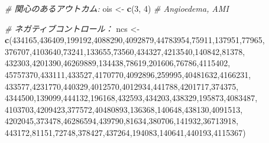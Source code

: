 \documentclass[
  11pt]{book}
\newenvironment{Shaded}{\begin{snugshade}}{\end{snugshade}}
\newcommand{\CommentTok}[1]{\textcolor[rgb]{0.56,0.35,0.01}{\textit{#1}}}
\newcommand{\DecValTok}[1]{\textcolor[rgb]{0.00,0.00,0.81}{#1}}
\newcommand{\FunctionTok}[1]{\textcolor[rgb]{0.13,0.29,0.53}{\textbf{#1}}}
\newcommand{\NormalTok}[1]{#1}
\newcommand{\OtherTok}[1]{\textcolor[rgb]{0.56,0.35,0.01}{#1}}
\theoremstyle{definition}
\theoremstyle{definition}
\theoremstyle{definition}
\theoremstyle{definition}
\theoremstyle{remark}
\begin{document}
\begin{Shaded}
\begin{Highlighting}[]
\CommentTok{\# 関心のあるアウトカム:}
\NormalTok{ois }\OtherTok{\textless{}{-}} \FunctionTok{c}\NormalTok{(}\DecValTok{3}\NormalTok{, }\DecValTok{4}\NormalTok{) }\CommentTok{\# Angioedema, AMI}

\CommentTok{\# ネガティブコントロール：}
\NormalTok{ncs }\OtherTok{\textless{}{-}} \FunctionTok{c}\NormalTok{(}\DecValTok{434165}\NormalTok{,}\DecValTok{436409}\NormalTok{,}\DecValTok{199192}\NormalTok{,}\DecValTok{4088290}\NormalTok{,}\DecValTok{4092879}\NormalTok{,}\DecValTok{44783954}\NormalTok{,}\DecValTok{75911}\NormalTok{,}\DecValTok{137951}\NormalTok{,}\DecValTok{77965}\NormalTok{,}
         \DecValTok{376707}\NormalTok{,}\DecValTok{4103640}\NormalTok{,}\DecValTok{73241}\NormalTok{,}\DecValTok{133655}\NormalTok{,}\DecValTok{73560}\NormalTok{,}\DecValTok{434327}\NormalTok{,}\DecValTok{4213540}\NormalTok{,}\DecValTok{140842}\NormalTok{,}\DecValTok{81378}\NormalTok{,}
         \DecValTok{432303}\NormalTok{,}\DecValTok{4201390}\NormalTok{,}\DecValTok{46269889}\NormalTok{,}\DecValTok{134438}\NormalTok{,}\DecValTok{78619}\NormalTok{,}\DecValTok{201606}\NormalTok{,}\DecValTok{76786}\NormalTok{,}\DecValTok{4115402}\NormalTok{,}
         \DecValTok{45757370}\NormalTok{,}\DecValTok{433111}\NormalTok{,}\DecValTok{433527}\NormalTok{,}\DecValTok{4170770}\NormalTok{,}\DecValTok{4092896}\NormalTok{,}\DecValTok{259995}\NormalTok{,}\DecValTok{40481632}\NormalTok{,}\DecValTok{4166231}\NormalTok{,}
         \DecValTok{433577}\NormalTok{,}\DecValTok{4231770}\NormalTok{,}\DecValTok{440329}\NormalTok{,}\DecValTok{4012570}\NormalTok{,}\DecValTok{4012934}\NormalTok{,}\DecValTok{441788}\NormalTok{,}\DecValTok{4201717}\NormalTok{,}\DecValTok{374375}\NormalTok{,}
         \DecValTok{4344500}\NormalTok{,}\DecValTok{139099}\NormalTok{,}\DecValTok{444132}\NormalTok{,}\DecValTok{196168}\NormalTok{,}\DecValTok{432593}\NormalTok{,}\DecValTok{434203}\NormalTok{,}\DecValTok{438329}\NormalTok{,}\DecValTok{195873}\NormalTok{,}\DecValTok{4083487}\NormalTok{,}
         \DecValTok{4103703}\NormalTok{,}\DecValTok{4209423}\NormalTok{,}\DecValTok{377572}\NormalTok{,}\DecValTok{40480893}\NormalTok{,}\DecValTok{136368}\NormalTok{,}\DecValTok{140648}\NormalTok{,}\DecValTok{438130}\NormalTok{,}\DecValTok{4091513}\NormalTok{,}
         \DecValTok{4202045}\NormalTok{,}\DecValTok{373478}\NormalTok{,}\DecValTok{46286594}\NormalTok{,}\DecValTok{439790}\NormalTok{,}\DecValTok{81634}\NormalTok{,}\DecValTok{380706}\NormalTok{,}\DecValTok{141932}\NormalTok{,}\DecValTok{36713918}\NormalTok{,}
         \DecValTok{443172}\NormalTok{,}\DecValTok{81151}\NormalTok{,}\DecValTok{72748}\NormalTok{,}\DecValTok{378427}\NormalTok{,}\DecValTok{437264}\NormalTok{,}\DecValTok{194083}\NormalTok{,}\DecValTok{140641}\NormalTok{,}\DecValTok{440193}\NormalTok{,}\DecValTok{4115367}\NormalTok{)}


\end{Highlighting}
\end{Shaded}
\end{document}
